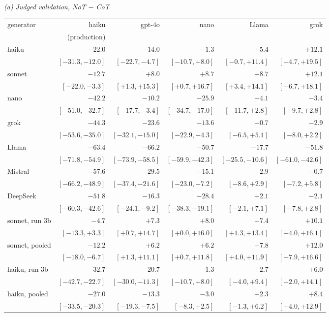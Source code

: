 {\footnotesize
\setlength{\tabcolsep}{4pt}
\textit{(a) Judged validation, NoT $-$ CoT}\\[2pt]
\begin{tabular}{@{}lrrrrr@{}}
\toprule
generator & haiku & gpt-4o & nano & Llama & grok \\
 & (production) &  &  &  &  \\
\midrule
haiku & $-22.0$ & $-14.0$ & $-1.3$ & $+5.4$ & $+12.1$ \\
 & $[-31.3, -12.0]$ & $[-22.7, -4.7]$ & $[-10.7, +8.0]$ & $[-0.7, +11.4]$ & $[+4.7, +19.5]$ \\[1pt]
sonnet & $-12.7$ & $+8.0$ & $+8.7$\rlap{\smash{$^{\dagger}$}} & $+8.7$ & $+12.1$ \\
 & $[-22.0, -3.3]$ & $[+1.3, +15.3]$ & $[+0.7, +16.7]$ & $[+3.4, +14.1]$ & $[+6.7, +18.1]$ \\[1pt]
nano & $-42.2$ & $-10.2$ & $-25.9$ & $-4.1$ & $-3.4$ \\
 & $[-51.0, -32.7]$ & $[-17.7, -3.4]$ & $[-34.7, -17.0]$ & $[-11.7, +2.8]$ & $[-9.7, +2.8]$ \\[1pt]
grok & $-44.3$ & $-23.6$ & $-13.6$ & $-0.7$ & $-2.9$ \\
 & $[-53.6, -35.0]$ & $[-32.1, -15.0]$ & $[-22.9, -4.3]$ & $[-6.5, +5.1]$ & $[-8.0, +2.2]$ \\[1pt]
Llama & $-63.4$ & $-66.2$ & $-50.7$ & $-17.7$ & $-51.8$ \\
 & $[-71.8, -54.9]$ & $[-73.9, -58.5]$ & $[-59.9, -42.3]$ & $[-25.5, -10.6]$ & $[-61.0, -42.6]$ \\[1pt]
Mistral & $-57.6$ & $-29.5$ & $-15.1$ & $-2.9$ & $-0.7$ \\
 & $[-66.2, -48.9]$ & $[-37.4, -21.6]$ & $[-23.0, -7.2]$ & $[-8.6, +2.9]$ & $[-7.2, +5.8]$ \\[1pt]
DeepSeek & $-51.8$ & $-16.3$ & $-28.4$ & $+2.1$ & $-2.1$ \\
 & $[-60.3, -42.6]$ & $[-24.1, -9.2]$ & $[-38.3, -19.1]$ & $[-2.1, +7.1]$ & $[-7.8, +2.8]$ \\[1pt]
\midrule
sonnet, run 3b & $-4.7$ & $+7.3$ & $+8.0$ & $+7.4$ & $+10.1$ \\
 & $[-13.3, +3.3]$ & $[+0.7, +14.7]$ & $[+0.0, +16.0]$ & $[+1.3, +13.4]$ & $[+4.0, +16.1]$ \\[1pt]
sonnet, pooled & $-12.2$ & $+6.2$ & $+6.2$ & $+7.8$ & $+12.0$ \\
 & $[-18.0, -6.7]$ & $[+1.3, +11.1]$ & $[+0.7, +11.8]$ & $[+4.0, +11.9]$ & $[+7.9, +16.6]$ \\[1pt]
haiku, run 3b & $-32.7$ & $-20.7$ & $-1.3$ & $+2.7$ & $+6.0$ \\
 & $[-42.7, -22.7]$ & $[-30.0, -11.3]$ & $[-10.7, +8.0]$ & $[-4.0, +9.4]$ & $[-2.0, +14.1]$ \\[1pt]
haiku, pooled & $-27.0$ & $-13.3$ & $-3.0$ & $+2.3$ & $+8.4$ \\
 & $[-33.5, -20.3]$ & $[-19.3, -7.5]$ & $[-8.3, +2.5]$ & $[-1.3, +6.2]$ & $[+4.0, +12.9]$ \\[1pt]
\bottomrule
\end{tabular}
}

